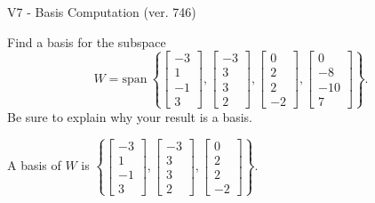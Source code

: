 \begin{exercise}
  \begin{exerciseTitle}V7 - Basis Computation (ver. 746)\end{exerciseTitle}
  \begin{exerciseStatement}
    Find a basis for the subspace 
\[W=\mathrm{span}\ \left\{\left[\begin{array}{r}
-3 \\
1 \\
-1 \\
3
\end{array}\right] , \left[\begin{array}{r}
-3 \\
3 \\
3 \\
2
\end{array}\right] , \left[\begin{array}{r}
0 \\
2 \\
2 \\
-2
\end{array}\right] , \left[\begin{array}{r}
0 \\
-8 \\
-10 \\
7
\end{array}\right]\right\}.\]
 Be sure to explain why your result is a basis.


  \end{exerciseStatement}
  \begin{exerciseAnswer}
   A basis of \(W\) is  \(\left\{\left[\begin{array}{r}
-3 \\
1 \\
-1 \\
3
\end{array}\right] , \left[\begin{array}{r}
-3 \\
3 \\
3 \\
2
\end{array}\right] , \left[\begin{array}{r}
0 \\
2 \\
2 \\
-2
\end{array}\right]\right\}\).
  


  \end{exerciseAnswer}
\end{exercise}